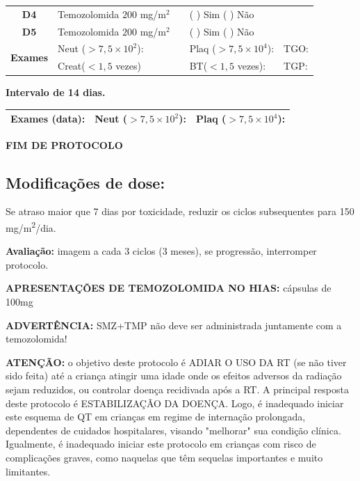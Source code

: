 \documentclass[11pt,a4paper,oldfontcommands]{memoir}
\begin{document}
\begin{center}
\begin{table}[H]
\begin{tabular}{p{1cm}p{5cm}|p{1cm}|p{4.5cm}|p{2cm}}
    \multicolumn{1}{c|}{\multirow{1}{*}{\textbf{D4}}}&{Temozolomida \(200\) mg/m\(^2\)}&&{(  ) Sim (  ) Não}&\\
    \multicolumn{1}{c|}{\multirow{1}{*}{\textbf{D5}}}&{Temozolomida \(200\) mg/m\(^2\)}&&{(  ) Sim (  ) Não}&\\
    \hline
    \multicolumn{1}{c|}{\multirow{2}{*}{\textbf{Exames}}}&\multicolumn{2}{l|}{Neut (\(>7,5\times10^2\)):}&{Plaq (\(>7,5\times10^4\)):}&{TGO:}\\
    \cline{2-5}
    \multicolumn{1}{c|}{\multirow{2}{*}{{}}}&\multicolumn{2}{l|}{Creat(\(<1,5\) vezes)}&{BT(\(<1,5\) vezes):}&{TGP:}
    \\
    \hline
\end{tabular}
\end{table}
\textbf{Intervalo de 14 dias.}
\begin{table}[H]
\begin{tabular}{p{5cm}|p{5cm}|p{4.7cm}}
    \hline
    \textbf{Exames (data):}&{Neut (\(>7,5\times10^2\)):}&{Plaq (\(>7,5\times10^4\)):}
    \\
    \hline
\end{tabular}
\end{table}

\textbf{FIM DE PROTOCOLO}

\end{center}
\subsection{Modificações de dose:}
Se atraso maior que 7 dias por toxicidade, reduzir os ciclos subsequentes para 150 mg/m\textsuperscript{2}/dia.

\textbf{Avaliação:} imagem a cada 3 ciclos (3 meses), se progressão, interromper protocolo.

\textbf{APRESENTAÇÕES DE TEMOZOLOMIDA NO HIAS:} cápsulas de 100mg

\textbf{ADVERTÊNCIA:} SMZ+TMP não deve ser administrada juntamente com a temozolomida!

\textbf{ATENÇÃO:} o objetivo deste protocolo é ADIAR O USO DA RT (se não tiver sido feita) até a criança atingir uma idade onde os efeitos adversos da radiação sejam reduzidos, ou controlar doença recidivada após a RT. A principal resposta deste protocolo é ESTABILIZAÇÃO DA DOENÇA. Logo, é inadequado iniciar este esquema de QT em crianças em regime de internação prolongada, dependentes de cuidados hospitalares, visando "melhorar" sua condição clínica. Igualmente, é inadequado iniciar este protocolo em crianças com risco de complicações graves, como naquelas que têm sequelas importantes e muito limitantes.
\end{document}
